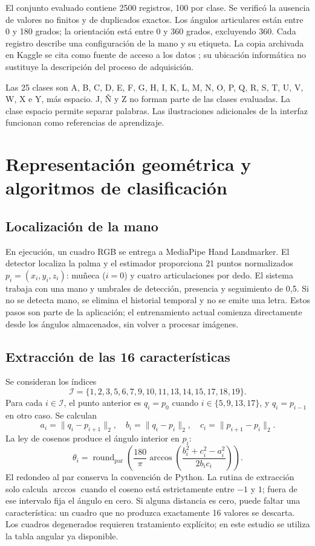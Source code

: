 \documentclass[11pt,a4paper]{article}
\begin{document}
El conjunto evaluado contiene 2500 registros, 100 por clase. Se verificó la ausencia de valores no finitos y de duplicados exactos. Los ángulos articulares están entre 0 y 180 grados; la orientación está entre 0 y 360 grados, excluyendo 360. Cada registro describe una configuración de la mano y su etiqueta. La copia archivada en Kaggle se cita como fuente de acceso a los datos \cite{dataset}; su ubicación informática no sustituye la descripción del proceso de adquisición.

Las 25 clases son A, B, C, D, E, F, G, H, I, K, L, M, N, O, P, Q, R, S, T, U, V, W, X e Y, más espacio. J, Ñ y Z no forman parte de las clases evaluadas. La clase espacio permite separar palabras. Las ilustraciones adicionales de la interfaz funcionan como referencias de aprendizaje.

\section{Representación geométrica y algoritmos de clasificación}
\subsection{Localización de la mano}
En ejecución, un cuadro RGB se entrega a MediaPipe Hand Landmarker. El detector localiza la palma y el estimador proporciona 21 puntos normalizados $p_i=(x_i,y_i,z_i)$: muñeca ($i=0$) y cuatro articulaciones por dedo. El sistema trabaja con una mano y umbrales de detección, presencia y seguimiento de 0,5. Si no se detecta mano, se elimina el historial temporal y no se emite una letra. Estos pasos son parte de la aplicación; el entrenamiento actual comienza directamente desde los ángulos almacenados, sin volver a procesar imágenes.

\subsection{Extracción de las 16 características}
Se consideran los índices
\[
\mathcal I=\{1,2,3,5,6,7,9,10,11,13,14,15,17,18,19\}.
\]
Para cada $i\in\mathcal I$, el punto anterior es $q_i=p_0$ cuando $i\in\{5,9,13,17\}$, y $q_i=p_{i-1}$ en otro caso. Se calculan
\begin{equation}
a_i=\|q_i-p_{i+1}\|_2,\quad b_i=\|q_i-p_i\|_2,\quad c_i=\|p_{i+1}-p_i\|_2.
\end{equation}
La ley de cosenos produce el ángulo interior en $p_i$:
\begin{equation}
\theta_i=\operatorname{round}_{\mathrm{par}}\left(\frac{180}{\pi}\arccos\left(\frac{b_i^2+c_i^2-a_i^2}{2b_ic_i}\right)\right).
\end{equation}
El redondeo al par conserva la convención de Python. La rutina de extracción solo calcula $\arccos$ cuando el coseno está estrictamente entre $-1$ y $1$; fuera de ese intervalo fija el ángulo en cero. Si alguna distancia es cero, puede faltar una característica: un cuadro que no produzca exactamente 16 valores se descarta. Los cuadros degenerados requieren tratamiento explícito; en este estudio se utiliza la tabla angular ya disponible.
\end{document}
